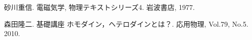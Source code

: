 \documentclass[uplatex,dvipdfmx,a4j,12pt]{jsarticle}
\begin{document}
\begin{thebibliography}{9}
    砂川重信. 電磁気学, 物理テキストシリーズ4. 岩波書店, 1977.

  森田隆二. 基礎講座 ホモダイン，ヘテロダインとは？. 応用物理, Vol.79, No.5. 2010.

    
\end{thebibliography}
\end{document}
